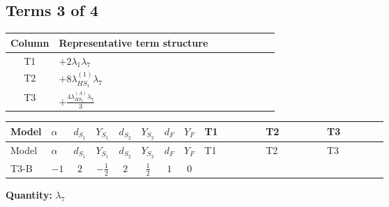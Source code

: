 \documentclass[8pt]{article}
\begin{document}
\begin{landscape}
\subsection*{Terms 3 of 4}
\begin{center}
\begin{tabular}{@{}c >{\raggedright\arraybackslash}p{0.82\linewidth}@{}}
\toprule
Column & Representative term structure \\
\midrule
T1 & \(\displaystyle +2 {\lambda_1} {\lambda_{7}}\) \\
\midrule
T2 & \(\displaystyle +8 {\lambda_{HS_1}^{(1)}} {\lambda_{7}}\) \\
\midrule
T3 & \(\displaystyle +\frac{4 {\lambda_{HS_1}^{(A)}} {\lambda_{7}}}{3}\) \\
\midrule
\bottomrule
\end{tabular}
\end{center}
\smallskip
\tiny
\begin{longtable}{@{}llcccccc >{\raggedright\arraybackslash}p{0.21\linewidth} >{\raggedright\arraybackslash}p{0.21\linewidth} >{\raggedright\arraybackslash}p{0.21\linewidth}@{}}
\toprule
Model & $\alpha$ & $d_{S_1}$ & $Y_{S_1}$ & $d_{S_2}$ & $Y_{S_2}$ & $d_F$ & $Y_F$ & T1 & T2 & T3 \\
\midrule
\endfirsthead
\toprule
Model & $\alpha$ & $d_{S_1}$ & $Y_{S_1}$ & $d_{S_2}$ & $Y_{S_2}$ & $d_F$ & $Y_F$ & T1 & T2 & T3 \\
\midrule
\endhead
T3-B & $-1$ & $2$ & $-\frac{1}{2}$ & $2$ & $\frac{1}{2}$ & $1$ & $0$ & \scriptsize\adjustbox{max width=\linewidth}{$\begin{gathered} +2 {\lambda_1} {\lambda_{7}}\end{gathered}$} & \scriptsize\adjustbox{max width=\linewidth}{$\begin{gathered} +8 {\lambda_{HS_1}^{(1)}} {\lambda_{7}}\end{gathered}$} & \scriptsize\adjustbox{max width=\linewidth}{$\begin{gathered} +\frac{4 {\lambda_{HS_1}^{(A)}} {\lambda_{7}}}{3}\end{gathered}$} \\
\midrule
\bottomrule
\end{longtable}
\clearpage
\noindent\textbf{Quantity: }$\lambda_{7}$\par\smallskip

\end{landscape}
\end{document}
